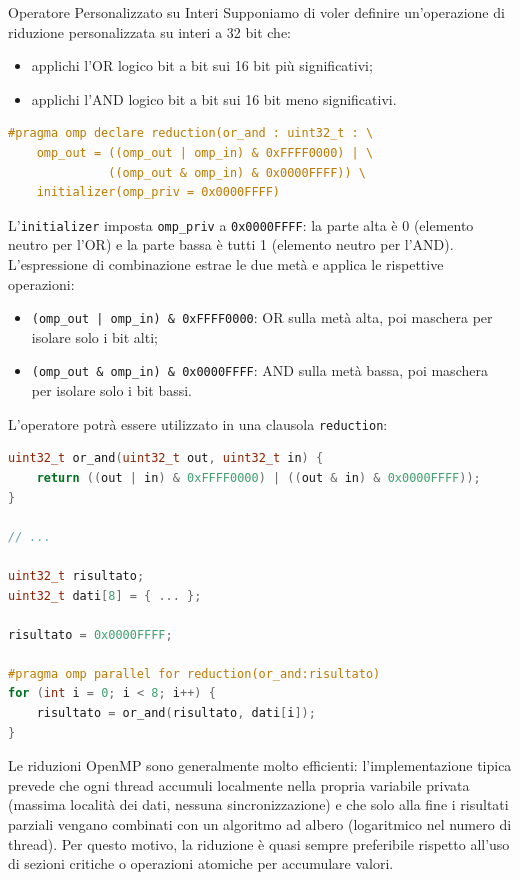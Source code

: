 \begin{example}{Operatore Personalizzato su Interi}
    Supponiamo di voler definire un'operazione di riduzione personalizzata su interi a 32 bit che:
    \begin{itemize}
        \item applichi l'OR logico bit a bit sui 16 bit più significativi;
        \item applichi l'AND logico bit a bit sui 16 bit meno significativi.
    \end{itemize}
    
    \begin{lstlisting}[language=C, numbers=none]
#pragma omp declare reduction(or_and : uint32_t : \
    omp_out = ((omp_out | omp_in) & 0xFFFF0000) | \
              ((omp_out & omp_in) & 0x0000FFFF)) \
    initializer(omp_priv = 0x0000FFFF)
    \end{lstlisting}

    L'\texttt{initializer} imposta \texttt{omp\_priv} a \texttt{0x0000FFFF}: la parte alta è 0 (elemento neutro per l'OR) e la parte bassa è tutti 1 (elemento neutro per l'AND).
    L'espressione di combinazione estrae le due metà e applica le rispettive operazioni:
    \begin{itemize}
        \item \texttt{(omp\_out | omp\_in) \& 0xFFFF0000}: OR sulla metà alta, poi maschera per isolare solo i bit alti;
        \item \texttt{(omp\_out \& omp\_in) \& 0x0000FFFF}: AND sulla metà bassa, poi maschera per isolare solo i bit bassi.
    \end{itemize}
    
    L'operatore potrà essere utilizzato in una clausola \texttt{reduction}:
    \begin{lstlisting}[language=c]
uint32_t or_and(uint32_t out, uint32_t in) {
    return ((out | in) & 0xFFFF0000) | ((out & in) & 0x0000FFFF));
}

// ...

uint32_t risultato;
uint32_t dati[8] = { ... };

risultato = 0x0000FFFF;

#pragma omp parallel for reduction(or_and:risultato)
for (int i = 0; i < 8; i++) {
    risultato = or_and(risultato, dati[i]);
}
    \end{lstlisting}
\end{example}

Le riduzioni OpenMP sono generalmente molto efficienti: l'implementazione tipica prevede che ogni thread accumuli localmente nella propria variabile privata (massima località dei dati, nessuna sincronizzazione) e che solo alla fine i risultati parziali vengano combinati con un algoritmo ad albero (logaritmico nel numero di thread). 
Per questo motivo, la riduzione è quasi sempre preferibile rispetto all'uso di sezioni critiche o operazioni atomiche per accumulare valori.

